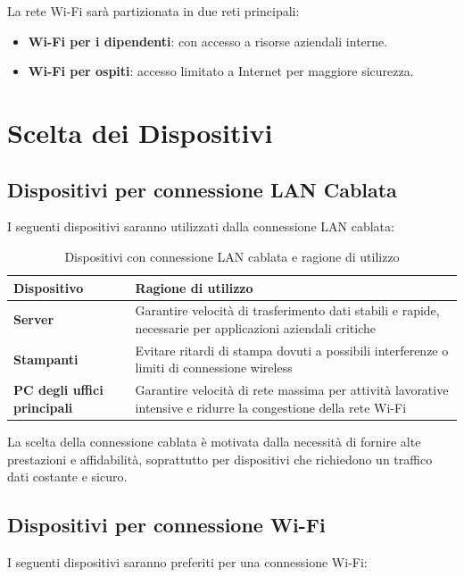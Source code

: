 \documentclass{assignment}
\begin{document}
La rete Wi-Fi sarà partizionata in due reti principali:
\begin{itemize}
    \item \textbf{Wi-Fi per i dipendenti}: con accesso a risorse aziendali interne.
    \item \textbf{Wi-Fi per ospiti}: accesso limitato a Internet per maggiore sicurezza.
\end{itemize}

\section{Scelta dei Dispositivi}

\subsection{Dispositivi per connessione LAN Cablata}
I seguenti dispositivi saranno utilizzati dalla connessione LAN cablata:

\begin{table}[H]
    \centering
    \begin{tabular}{>{\bfseries}m{4cm}|m{10cm}}
        \toprule
        \rowcolor{lightblue}
        \textbf{Dispositivo} & \textbf{Ragione di utilizzo} \\
        \midrule
        Server & Garantire velocità di trasferimento dati stabili e rapide, necessarie per applicazioni aziendali critiche \\
        \midrule
        Stampanti & Evitare ritardi di stampa dovuti a possibili interferenze o limiti di connessione wireless \\
        \midrule
        PC degli uffici principali & Garantire velocità di rete massima per attività lavorative intensive e ridurre la congestione della rete Wi-Fi \\
        \bottomrule
    \end{tabular}
    \caption{Dispositivi con connessione LAN cablata e ragione di utilizzo}
    \end{table}
La scelta della connessione cablata è motivata dalla necessità di fornire alte prestazioni e affidabilità, soprattutto per dispositivi che richiedono un traffico dati costante e sicuro.

\subsection {Dispositivi per connessione Wi-Fi}

I seguenti dispositivi saranno preferiti per una connessione Wi-Fi:
\end{document}
